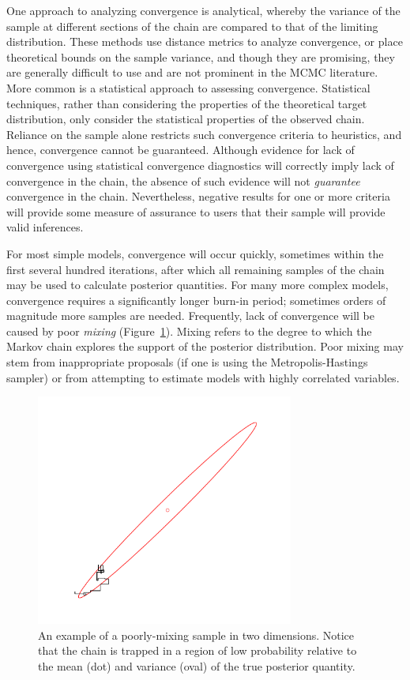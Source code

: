 \documentclass[]{jss}
\begin{document}
One approach to analyzing convergence is analytical, whereby the variance of the sample at different sections of the chain are compared to that of the limiting distribution. These methods use distance metrics to analyze convergence, or place theoretical bounds on the sample variance, and though they are promising, they are generally difficult to use and are not prominent in the MCMC literature. More common is a statistical approach to assessing convergence. Statistical techniques, rather than considering the properties of the theoretical target distribution, only consider the statistical properties of the observed chain. Reliance on the sample alone restricts such convergence criteria to heuristics, and hence, convergence cannot be guaranteed. Although evidence for lack of convergence using statistical convergence diagnostics will correctly imply lack of convergence in the chain, the absence of such evidence will not \emph{guarantee} convergence in the chain. Nevertheless, negative results for one or more criteria will provide some measure of assurance to users that their sample will provide valid inferences.

For most simple models, convergence will occur quickly, sometimes within the first several hundred iterations, after which all remaining samples of the chain may be used to calculate posterior quantities. For many more complex models, convergence requires a significantly longer burn-in period; sometimes  orders of magnitude more samples are needed. Frequently, lack of convergence will be caused by poor \emph{mixing} (Figure~\ref{fig:mix}). Mixing refers to the degree to which the Markov chain explores the support of the posterior distribution. Poor mixing may stem from inappropriate proposals (if one is using the Metropolis-Hastings sampler) or from attempting to estimate models with highly correlated variables.

\begin{figure}[ht]
\begin{center}
\includegraphics[height=3in]{poormixing.pdf}
\caption{An example of a poorly-mixing sample in two dimensions. Notice that the chain is trapped in a region of low probability relative to the mean (dot) and variance (oval) of the true posterior quantity.}
\label{fig:mix}
\end{center}
\end{figure}
\end{document}
